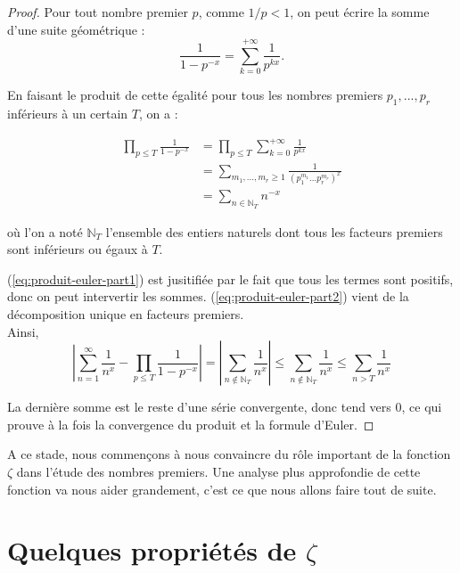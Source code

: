 \documentclass[french]{report}
\begin{document}
\begin{proof}
  Pour tout nombre premier $p$, comme $1/p<1$, on peut écrire la somme d'une suite géométrique :
  \[ \frac{1}{1-p^{-x}}=\sum_{k=0}^{+\infty}\frac{1}{p^{kx}}. \]

  En faisant le produit de cette égalité pour tous les nombres premiers $p_1, ..., p_r$ inférieurs à un certain $T$, on a :
  
  \begin{align}
    \prod_{p\leq T}\frac{1}{1-p^{-x}}
    &= \prod_{p\leq T}\sum_{k=0}^{+\infty}\frac{1}{p^{kx}}  \\
    &= \sum_{m_1,...,m_r\geq1}\frac{1}{(p_1^{m_1}...p_r^{m_r})^x} \label{eq:produit-euler-part1} \\
    &= \sum_{n\in\mathbb{N}_T}n^{-x} \label{eq:produit-euler-part2}
  \end{align}

  où l'on a noté $\mathbb{N}_T$ l'ensemble des entiers naturels dont tous les facteurs premiers sont inférieurs ou égaux à $T$.

  (\ref{eq:produit-euler-part1}) est jusitifiée par le fait que tous les termes sont positifs, donc on peut intervertir les sommes. (\ref{eq:produit-euler-part2}) vient de la décomposition unique en facteurs premiers.
  \\

  Ainsi,
  \[ \left|\sum_{n=1}^{\infty}\frac{1}{n^x}-\prod_{p\leq T}\frac{1}{1-p^{-x}}\right|
  = \left|\sum_{n\notin\mathbb{N}_T}\frac{1}{n^x}\right|
  \leq \sum_{n\notin\mathbb{N}_T}\frac{1}{n^x}
  \leq \sum_{n>T}\frac{1}{n^x}
  \]

  La dernière somme est le reste d'une série convergente, donc tend vers 0, ce qui prouve à la fois la convergence du produit et la formule d'Euler.
\end{proof}

A ce stade, nous commençons à nous convaincre du rôle important de la fonction $\zeta$ dans l'étude des nombres premiers. Une analyse plus approfondie de cette fonction va nous aider grandement, c'est ce que nous allons faire tout de suite.

\section{Quelques propriétés de $\zeta$}
\end{document}
